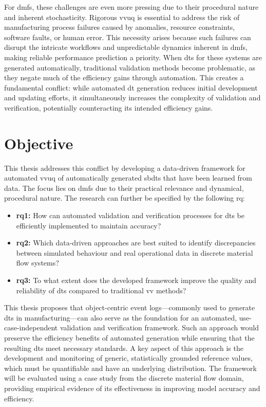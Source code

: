 For \gls{dmfs}, these challenges are even more pressing due to their procedural nature and inherent stochasticity. Rigorous \gls{vvuq} is essential to address the risk of manufacturing process failures caused by anomalies, resource constraints, software faults, or human error. This necessity arises because such failures can disrupt the intricate workflows and unpredictable dynamics inherent in \gls{dmfs}, making reliable performance prediction a priority. When \gls{dt}s for these systems are generated automatically, traditional validation methods become problematic, as they negate much of the efficiency gains through automation. This creates a fundamental conflict: while automated \gls{dt} generation reduces initial development and updating efforts, it simultaneously increases the complexity of validation and verification, potentially counteracting its intended efficiency gains.

\section{Objective}

This thesis addresses this conflict by developing a data-driven framework for automated \gls{vvuq} of automatically generated \gls{sbdt}s that have been learned from data. The focus lies on \gls{dmfs} due to their practical relevance and dynamical, procedural nature. The research can further be specified by the following \gls{rq}:

\begin{itemize}
  \label{par:rq1}
  \item \textbf{\gls{rq}1:} How can automated validation and verification processes for \gls{dt}s be efficiently implemented to maintain accuracy?
        \label{par:rq2}
  \item \textbf{\gls{rq}2:} Which data-driven approaches are best suited to identify discrepancies between simulated behaviour and real operational data in discrete material flow systems?
        \label{par:rq3}
  \item \textbf{\gls{rq}3:} To what extent does the developed framework improve the quality and reliability of \gls{dt}s compared to traditional \gls{vv} methods?
\end{itemize}

This thesis proposes that object-centric event logs—commonly used to generate \gls{dt}s in manufacturing—can also serve as the foundation for an automated, use-case-independent validation and verification framework. Such an approach would preserve the efficiency benefits of automated generation while ensuring that the resulting \gls{dt}s meet necessary standards. A key aspect of this approach is the development and monitoring of generic, statistically grounded reference values, which must be quantifiable and have an underlying distribution. The framework will be evaluated using a case study from the discrete material flow domain, providing empirical evidence of its effectiveness in improving model accuracy and efficiency.

